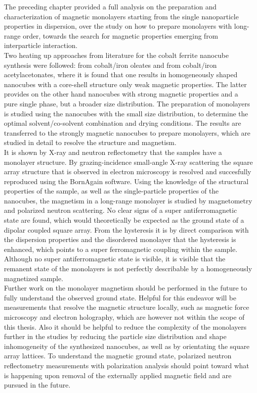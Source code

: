 \documentclass[\main/dresen_thesis.tex]{subfiles}
\begin{document}
  The preceding chapter provided a full analysis on the preparation and characterization of magnetic monolayers starting from the single nanoparticle properties in dispersion, over the study on how to prepare monolayers with long-range order, towards the search for magnetic properties emerging from interparticle interaction.
  \\

  Two heating up approaches from literature for the cobalt ferrite nanocube synthesis were followed: from cobalt/iron oleates and from cobalt/iron acetylacetonates, where it is found that one results in homogeneously shaped nanocubes with a core-shell structure only weak magnetic properties.
  The latter provides on the other hand nanocubes with strong magnetic properties and a pure single phase, but a broader size distribution.
  The preparation of monolayers is studied using the nanocubes with the small size distribution, to determine the optimal solvent/co-solvent combination and drying conditions.
  The results are transferred to the strongly magnetic nanocubes to prepare monolayers, which are studied in detail to resolve the structure and magnetism.
  \\

  It is shown by X-ray and neutron reflectometry that the samples have a monolayer structure.
  By grazing-incidence small-angle X-ray scattering the square array structure that is observed in electron microscopy is resolved and succesfully reproduced using the BornAgain software.
  Using the knowledge of the structural properties of the sample, as well as the single-particle properties of the nanocubes, the magnetism in a long-range monolayer is studied by magnetometry and polarized neutron scattering.
  No clear signs of a super antiferromagnetic state are found, which would theoretically be expected as the ground state of a dipolar coupled square array.
  From the hysteresis it is by direct comparison with the dispersion properties and the disordered monolayer that the hysteresis is enhanced, which points to a super ferromagnetic coupling within the sample.
  Although no super antiferromagnetic state is visible, it is visible that the remanent state of the monolayers is not perfectly describable by a homogeneously magnetized sample.
  \\

  Further work on the monolayer magnetism should be performed in the future to fully understand the observed ground state.
  Helpful for this endeavor will be measurements that resolve the magnetic structure locally, such as magnetic force microscopy and electron holography, which are however not within the scope of this thesis.
  Also it should be helpful to reduce the complexity of the monolayers further in the studies by reducing the particle size distribution and shape inhomogeneity of the synthesized nanocubes, as well as by orientating the square array lattices.
  To understand the magnetic ground state, polarized neutron reflectometry measurements with polarization analysis should point toward what is happening upon removal of the externally applied magnetic field and are pursued in the future.
\end{document}
